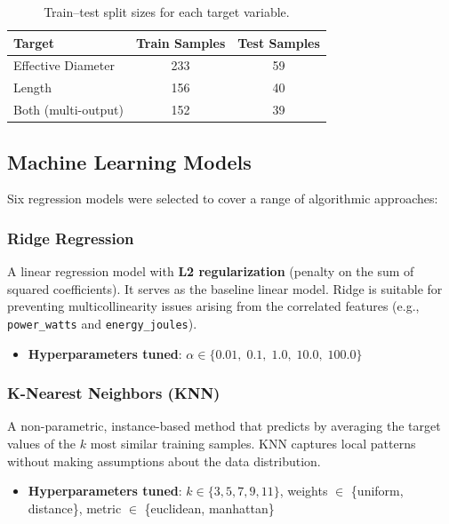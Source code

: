 \documentclass[12pt, a4paper]{article}
\begin{document}
\begin{table}[H]
\centering
\caption{Train--test split sizes for each target variable.}
\label{tab:split}
\begin{tabular}{@{}lcc@{}}
\toprule
\textbf{Target} & \textbf{Train Samples} & \textbf{Test Samples} \\
\midrule
Effective Diameter & 233 & 59 \\
Length             & 156 & 40 \\
Both (multi-output)& 152 & 39 \\
\bottomrule
\end{tabular}
\end{table}

\subsection{Machine Learning Models}
\label{sec:ml-models}

Six regression models were selected to cover a range of algorithmic approaches:

\subsubsection{Ridge Regression}
\label{sec:ridge}

A linear regression model with \textbf{L2 regularization} (penalty on the sum of squared coefficients). It serves as the baseline linear model. Ridge is suitable for preventing multicollinearity issues arising from the correlated features (e.g., \texttt{power\_watts} and \texttt{energy\_joules}).

\begin{itemize}
    \item \textbf{Hyperparameters tuned}: $\alpha \in \{0.01,\; 0.1,\; 1.0,\; 10.0,\; 100.0\}$
\end{itemize}

\subsubsection{K-Nearest Neighbors (KNN)}
\label{sec:knn}

A non-parametric, instance-based method that predicts by averaging the target values of the $k$ most similar training samples. KNN captures local patterns without making assumptions about the data distribution.

\begin{itemize}
    \item \textbf{Hyperparameters tuned}: $k \in \{3, 5, 7, 9, 11\}$, weights $\in$ \{uniform, distance\}, metric $\in$ \{euclidean, manhattan\}
\end{itemize}
\end{document}
